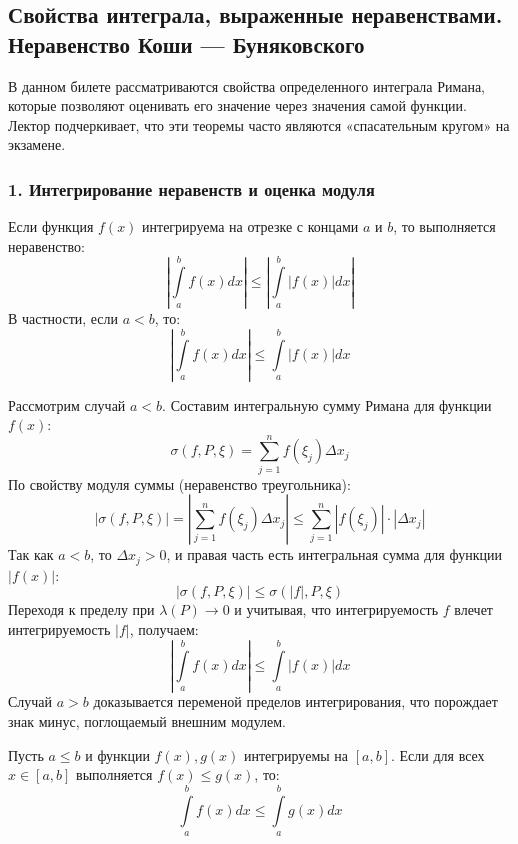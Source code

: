 \subsection{Свойства интеграла, выраженные неравенствами. Неравенство Коши — Буняковского}

В данном билете рассматриваются свойства определенного интеграла Римана, которые позволяют оценивать его значение через значения самой функции. Лектор подчеркивает, что эти теоремы часто являются «спасательным кругом» на экзамене.

\subsubsection*{1. Интегрирование неравенств и оценка модуля}

\begin{theorem}
Если функция $f(x)$ интегрируема на отрезке с концами $a$ и $b$, то выполняется неравенство:
\[ \left| \int\limits_a^b f(x) dx \right| \le \left| \int\limits_a^b |f(x)| dx \right| \]
В частности, если $a < b$, то:
\[ \left| \int\limits_a^b f(x) dx \right| \le \int\limits_a^b |f(x)| dx \]
\end{theorem}

\begin{tcolorbox}[title=Доказательство, breakable]
Рассмотрим случай $a < b$. Составим интегральную сумму Римана для функции $f(x)$:
\[ \sigma(f, P, \xi) = \sum_{j=1}^n f(\xi_j) \Delta x_j \]
По свойству модуля суммы (неравенство треугольника):
\[ |\sigma(f, P, \xi)| = \left| \sum_{j=1}^n f(\xi_j) \Delta x_j \right| \le \sum_{j=1}^n |f(\xi_j)| \cdot |\Delta x_j| \]
Так как $a < b$, то $\Delta x_j > 0$, и правая часть есть интегральная сумма для функции $|f(x)|$:
\[ |\sigma(f, P, \xi)| \le \sigma(|f|, P, \xi) \]
Переходя к пределу при $\lambda(P) \to 0$ и учитывая, что интегрируемость $f$ влечет интегрируемость $|f|$, получаем:
\[ \left| \int\limits_a^b f(x) dx \right| \le \int\limits_a^b |f(x)| dx \]
Случай $a > b$ доказывается переменой пределов интегрирования, что порождает знак минус, поглощаемый внешним модулем.
\end{tcolorbox}

\begin{theorem}
Пусть $a \le b$ и функции $f(x), g(x)$ интегрируемы на $[a, b]$. Если для всех $x \in [a, b]$ выполняется $f(x) \le g(x)$, то:
\[ \int\limits_a^b f(x) dx \le \int\limits_a^b g(x) dx \]
\end{theorem}

